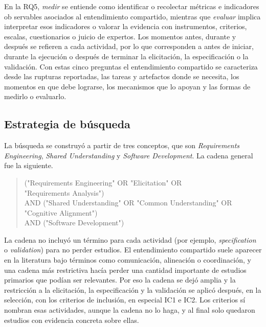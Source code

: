 \documentclass[12pt,letterpaper,oneside]{report}
\begin{document}
En la RQ5, \emph{medir} se entiende como identificar o recolectar métricas e indicadores ob
servables asociados al entendimiento compartido, mientras que \emph{evaluar} implica interpretar
esos indicadores o valorar la evidencia con instrumentos, criterios, escalas, cuestionarios o
juicio de expertos. Los momentos antes, durante y después se refieren a cada actividad,
por lo que corresponden a antes de iniciar, durante la ejecución o después de terminar la
elicitación, la especificación o la validación. Con estas cinco preguntas el entendimiento
compartido se caracteriza desde las rupturas reportadas, las tareas y artefactos donde se necesita, los momentos en que debe lograrse, los mecanismos que lo apoyan y las formas
de medirlo o evaluarlo.



\subsection{Estrategia de búsqueda}
La búsqueda se construyó a partir de tres conceptos, que son
\textit{Requirements Engineering}, \textit{Shared Understanding} y
\textit{Software Development}.
La cadena general fue la siguiente.

\begin{quote}\small\ttfamily
{}
("Requirements Engineering" OR "Elicitation" OR\\
\hspace*{1em}"Requirements Analysis")\\
AND ("Shared Understanding" OR "Common Understanding" OR\\
\hspace*{1em}"Cognitive Alignment")\\
AND ("Software Development")
\end{quote}

La cadena no incluyó un término para cada actividad (por ejemplo,
\textit{specification} o \textit{validation}) para no perder estudios. El
entendimiento compartido suele aparecer en la literatura bajo términos como
comunicación, alineación o coordinación, y una cadena más restrictiva hacía
perder una cantidad importante de estudios primarios que podían ser relevantes.
Por eso la cadena se dejó amplia y la restricción a la elicitación, la
especificación y la validación se aplicó después, en la selección, con los
criterios de inclusión, en especial IC1 e IC2. Los criterios sí nombran esas
actividades, aunque la cadena no lo haga, y al final solo quedaron estudios con
evidencia concreta sobre ellas.
\end{document}

